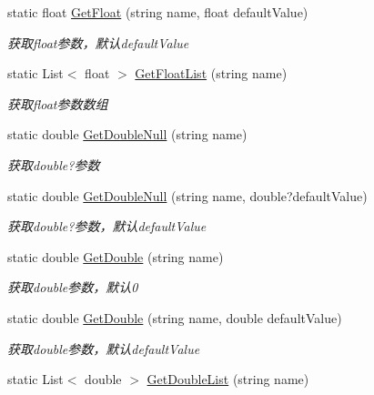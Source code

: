 \begin{DoxyCompactItemize}
static float \hyperlink{class_x_c_l_net_tools_1_1_string_hander_1_1_form_helper_acae860acd22e9f85511ccdc60c071c5c}{Get\-Float} (string name, float default\-Value)
\begin{DoxyCompactList}\small\item\em 获取float参数，默认default\-Value \end{DoxyCompactList}\item 
static List$<$ float $>$ \hyperlink{class_x_c_l_net_tools_1_1_string_hander_1_1_form_helper_ad405fffedfe8e34e61e4118754f99fe4}{Get\-Float\-List} (string name)
\begin{DoxyCompactList}\small\item\em 获取float参数数组 \end{DoxyCompactList}\item 
static double \hyperlink{class_x_c_l_net_tools_1_1_string_hander_1_1_form_helper_ac19469f1fde9f3cbdadb0481dd5bb67d}{Get\-Double\-Null} (string name)
\begin{DoxyCompactList}\small\item\em 获取double?参数 \end{DoxyCompactList}\item 
static double \hyperlink{class_x_c_l_net_tools_1_1_string_hander_1_1_form_helper_a032f11ed043dbf824356f28a2fdcebc7}{Get\-Double\-Null} (string name, double?default\-Value)
\begin{DoxyCompactList}\small\item\em 获取double?参数，默认default\-Value \end{DoxyCompactList}\item 
static double \hyperlink{class_x_c_l_net_tools_1_1_string_hander_1_1_form_helper_a5ce38e7b532cf3daf4a3d564034f78ec}{Get\-Double} (string name)
\begin{DoxyCompactList}\small\item\em 获取double参数，默认0 \end{DoxyCompactList}\item 
static double \hyperlink{class_x_c_l_net_tools_1_1_string_hander_1_1_form_helper_a36ebb953cd52bbb1e999c98a163bd05a}{Get\-Double} (string name, double default\-Value)
\begin{DoxyCompactList}\small\item\em 获取double参数，默认default\-Value \end{DoxyCompactList}\item 
static List$<$ double $>$ \hyperlink{class_x_c_l_net_tools_1_1_string_hander_1_1_form_helper_a3e7cff936c30c0bdc0c61f2c34ca942d}{Get\-Double\-List} (string name)

\end{DoxyCompactItemize}
